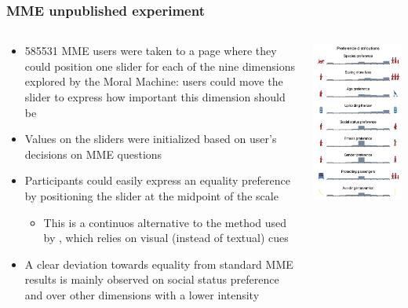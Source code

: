 \documentclass[aspectratio=169]{beamer}
\begin{document}
\begin{frame}
    \frametitle{MME unpublished experiment}
    \begin{columns}[totalwidth=1.0\textwidth]
        \begin{column}{0.6\linewidth}
            \begin{itemize}
                \item \num{585531} MME users were taken to a page where they could position one slider for each of the nine dimensions explored by the Moral Machine: users could move the slider to express how important this dimension should be
                \item Values on the sliders were initialized based on user's decisions on MME questions
                \item Participants could easily express an equality preference by positioning the slider at the midpoint of the scale
                      \begin{itemize}
                          \item This is a continuos alternative to the method used by \citeauthor{against-mme}, which relies on visual (instead of textual) cues
                      \end{itemize}
                \item A clear deviation towards equality from standard MME results is mainly observed on social status preference and over other dimensions with a lower intensity
            \end{itemize}
        \end{column}
        \begin{column}{0.35\linewidth}
            \includegraphics[width=0.7\linewidth]{assets/reply-against-mme-experiment.png}

\end{column}
\end{columns}
\end{frame}
\end{document}
